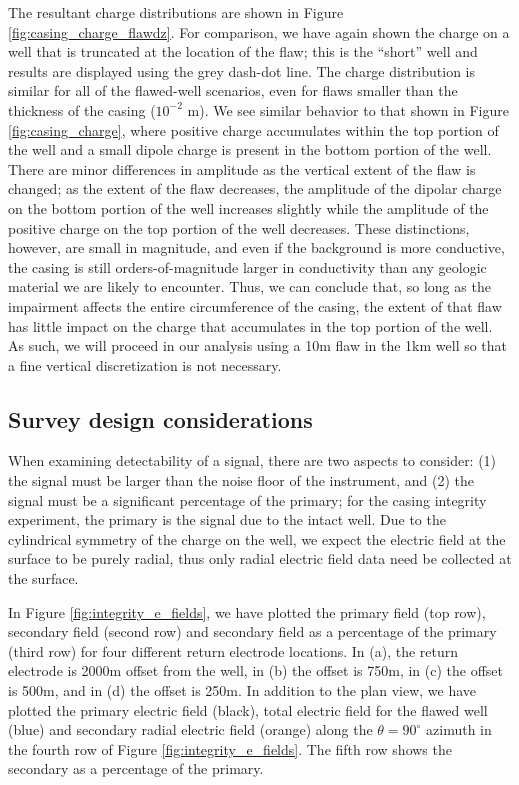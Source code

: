 The resultant charge distributions are shown in Figure \ref{fig:casing_charge_flawdz}. For comparison, we have again shown the charge on a well that is truncated at the location of the flaw; this is the  ``short'' well and results are displayed using the grey dash-dot line. The charge distribution is similar for all of the flawed-well scenarios, even for flaws smaller than the thickness of the casing ($10^{-2}$ m). We see similar behavior to that shown in Figure \ref{fig:casing_charge}, where positive charge accumulates within the top portion of the well and a small dipole charge is present in the bottom portion of the well. There are minor differences in amplitude as the vertical extent of the flaw is changed; as the extent of the flaw decreases, the amplitude of the dipolar charge on the bottom portion of the well increases slightly while the amplitude of the positive charge on the top portion of the well decreases. These distinctions, however, are small in magnitude, and even if the background is more conductive, the casing is still orders-of-magnitude larger in conductivity than any geologic material we are likely to encounter. Thus, we can conclude that, so long as the impairment affects the entire circumference of the casing, the extent of that flaw has little impact on the charge that accumulates in the top portion of the well. As such, we will proceed in our analysis using a 10m flaw in the 1km well so that a fine vertical discretization is not necessary.




\subsection{Survey design considerations}

When examining detectability of a signal, there are two aspects to consider: (1) the signal must be larger than the noise floor of the instrument, and (2) the signal must be a significant percentage of the primary; for the casing integrity experiment, the primary is the signal due to the intact well. Due to the cylindrical symmetry of the charge on the well, we expect the electric field at the surface to be purely radial, thus only radial electric field data need be collected at the surface.

In Figure \ref{fig:integrity_e_fields}, we have plotted the primary field (top row), secondary field (second row) and secondary field as a percentage of the primary (third row) for four different return electrode locations. In (a), the return electrode is 2000m offset from the well, in (b) the offset is 750m, in (c) the offset is 500m, and in (d) the offset is 250m. In addition to the plan view, we have plotted the primary electric field (black),  total electric field for the flawed well (blue) and secondary radial electric field (orange) along the $\theta = 90^\circ$ azimuth in the fourth row of Figure \ref{fig:integrity_e_fields}. The fifth row shows the secondary as a percentage of the primary.




